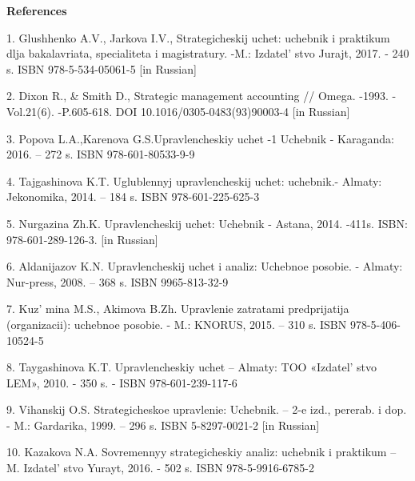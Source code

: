 \begin{center}
{\bfseries References}
\end{center}

\begin{references}
1. Glushhenko A.V., Jarkova I.V., Strategicheskij uchet: uchebnik i
praktikum dlja bakalavriata, specialit\-eta i magistratury. -M.:
Izdatel' stvo Jurajt, 2017. - 240 s. ISBN
978-5-534-05061-5 {[}in Russian{]}

2. Dixon R., \& Smith D., Strategic management accounting // Omega.
-1993. -Vol.21(6). -P.605-618. DOI 10.1016/0305-0483(93)90003-4 {[}in
Russian{]}

3. Popova L.A.,Karenova G.S.Upravlencheskiy uchet -1 Uchebnik -
Karaganda: 2016. -- 272 s. ISBN 978-601-80533-9-9

4. Tajgashinova K.T. Uglublennyj upravlencheskij uchet: uchebnik.-
Almaty: Jekonomika, 2014. -- 184 s. ISBN 978-601-225-625-3

5. Nurgazina Zh.K. Upravlencheskij uchet: Uchebnik - Astana, 2014.
-411s. ISBN: 978-601-289-126-3. {[}in Russian{]}

6. Aldanijazov K.N. Upravlencheskij uchet i analiz: Uchebnoe posobie. -
Almaty: Nur-press, 2008. -- 368 s. ISBN 9965-813-32-9

7. Kuz' mina M.S., Akimova B.Zh. Upravlenie zatratami
predprijatija (organizacii): uchebnoe posobie. - M.: KNORUS, 2015. --
310 s. ISBN 978-5-406-10524-5

8. Taygashinova K.T. Upravlencheskiy uchet -- Almaty: TOO
«Izdatel' stvo LEM», 2010. - 350 s. - ISBN
978-601-239-117-6

9. Vihanskij O.S. Strategicheskoe upravlenie: Uchebnik. -- 2-e izd.,
pererab. i dop. - M.: Gardarika, 1999. -- 296 s. ISBN 5-8297-0021-2
{[}in Russian{]}

10. Kazakova N.A. Sovremennyy strategicheskiy analiz: uchebnik i
praktikum -- M. Izdatel' stvo Yurayt, 2016. - 502 s. ISBN
978-5-9916-6785-2
\end{references}

